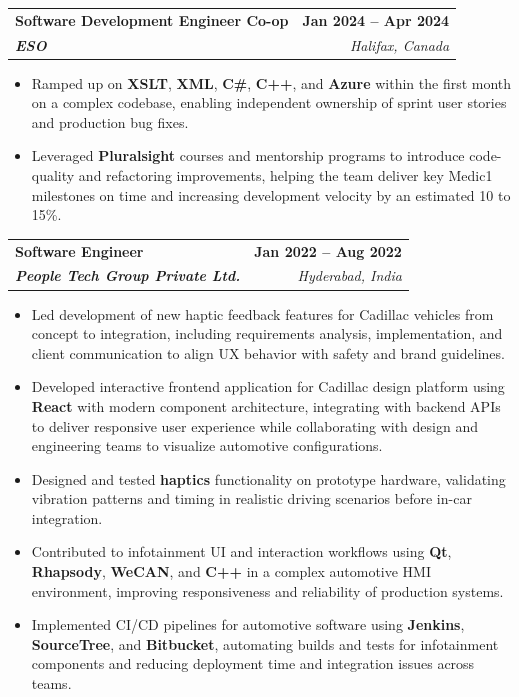 \documentclass[letterpaper,11pt]{article}
\makeatletter
\newcommand{\resumeItem}[1]{
  \item\small{
    {#1 \vspace{-2pt}}
  }
}
\newcommand{\resumeSubheading}[4]{
  \vspace{-2pt}\item
    \begin{tabular*}{1.0\textwidth}[t]{l@{\extracolsep{\fill}}r}
      \textbf{#1} & \textbf{\small #2} \\
      \textit{\small#3} & \textit{\small #4} \\
    \end{tabular*}\vspace{-7pt}
}
\newcommand{\resumeItemListStart}{\begin{itemize}}
\newcommand{\resumeItemListEnd}{\end{itemize}\vspace{-5pt}}
\makeatother
\begin{document}
    \resumeSubheading
      {\textbf{Software Development Engineer Co-op}}{\textbf{Jan 2024 -- Apr 2024}}
      {\textbf{ESO}}{Halifax, Canada}
      \resumeItemListStart
        \resumeItem{Ramped up on \textbf{XSLT}, \textbf{XML}, \textbf{C\#}, \textbf{C++}, and \textbf{Azure} within the first month on a complex codebase, enabling independent ownership of sprint user stories and production bug fixes.}
        \resumeItem{Leveraged \textbf{Pluralsight} courses and mentorship programs to introduce code-quality and refactoring improvements, helping the team deliver key Medic1 milestones on time and increasing development velocity by an estimated 10 to 15\%.}
      \resumeItemListEnd

    \resumeSubheading
      {\textbf{Software Engineer}}{\textbf{Jan 2022 -- Aug 2022}}
      {\textbf{People Tech Group Private Ltd.}}{Hyderabad, India}
      \resumeItemListStart
        \resumeItem{Led development of new haptic feedback features for Cadillac vehicles from concept to integration, including requirements analysis, implementation, and client communication to align UX behavior with safety and brand guidelines.}
        \resumeItem{Developed interactive frontend application for Cadillac design platform using \textbf{React} with modern component architecture, integrating with backend APIs to deliver responsive user experience while collaborating with design and engineering teams to visualize automotive configurations.}
        \resumeItem{Designed and tested \textbf{haptics} functionality on prototype hardware, validating vibration patterns and timing in realistic driving scenarios before in-car integration.}
        \resumeItem{Contributed to infotainment UI and interaction workflows using \textbf{Qt}, \textbf{Rhapsody}, \textbf{WeCAN}, and \textbf{C++} in a complex automotive HMI environment, improving responsiveness and reliability of production systems.}
        \resumeItem{Implemented CI/CD pipelines for automotive software using \textbf{Jenkins}, \textbf{SourceTree}, and \textbf{Bitbucket}, automating builds and tests for infotainment components and reducing deployment time and integration issues across teams.}
      \resumeItemListEnd
\end{document}
